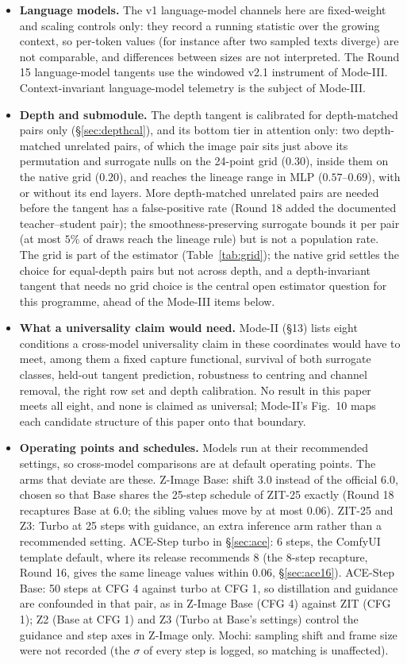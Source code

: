 \documentclass[11pt]{article}
\newcommand{\TT}{ZIT-25}%
\begin{document}
\begin{itemize}
 \item \textbf{Language models.} The v1 language-model channels here are fixed-weight and scaling controls only: they record a running statistic over the growing context, so per-token values (for instance after two sampled texts diverge) are not comparable, and differences between sizes are not interpreted. The Round 15 language-model tangents use the windowed v2.1 instrument of Mode-III. Context-invariant language-model telemetry is the subject of Mode-III.
 \item \textbf{Depth and submodule.} The depth tangent is calibrated for depth-matched pairs only (\S\ref{sec:depthcal}), and its bottom tier in attention only: two depth-matched unrelated pairs, of which the image pair sits just above its permutation and surrogate nulls on the 24-point grid ($0.30$), inside them on the native grid ($0.20$), and reaches the lineage range in MLP ($0.57$--$0.69$), with or without its end layers. More depth-matched unrelated pairs are needed before the tangent has a false-positive rate (Round 18 added the documented teacher--student pair); the smoothness-preserving surrogate bounds it per pair (at most $5\%$ of draws reach the lineage rule) but is not a population rate. The grid is part of the estimator (Table~\ref{tab:grid}); the native grid settles the choice for equal-depth pairs but not across depth, and a depth-invariant tangent that needs no grid choice is the central open estimator question for this programme, ahead of the Mode-III items below.
 \item \textbf{What a universality claim would need.} Mode-II (\S13) lists eight conditions a cross-model universality claim in these coordinates would have to meet, among them a fixed capture functional, survival of both surrogate classes, held-out tangent prediction, robustness to centring and channel removal, the right row set and depth calibration. No result in this paper meets all eight, and none is claimed as universal; Mode-II's Fig.~10 maps each candidate structure of this paper onto that boundary.
 \item \textbf{Operating points and schedules.} Models run at their recommended settings, so cross-model comparisons are at default operating points. The arms that deviate are these. Z-Image Base: shift $3.0$ instead of the official $6.0$, chosen so that Base shares the 25-step schedule of \TT{} exactly (Round 18 recaptures Base at $6.0$; the sibling values move by at most $0.06$). \TT{} and Z3: Turbo at 25 steps with guidance, an extra inference arm rather than a recommended setting. ACE-Step turbo in \S\ref{sec:ace}: 6 steps, the ComfyUI template default, where its release recommends 8 (the 8-step recapture, Round 16, gives the same lineage values within $0.06$, \S\ref{sec:ace16}). ACE-Step Base: 50 steps at CFG 4 against turbo at CFG 1, so distillation and guidance are confounded in that pair, as in Z-Image Base (CFG 4) against ZIT (CFG 1); Z2 (Base at CFG 1) and Z3 (Turbo at Base's settings) control the guidance and step axes in Z-Image only. Mochi: sampling shift and frame size were not recorded (the $\sigma$ of every step is logged, so matching is unaffected).

\end{itemize}
\end{document}
